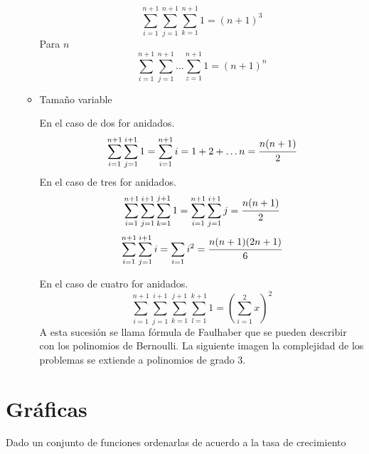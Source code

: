 \documentclass{article}
\begin{document}
\begin{enumerate}
\begin{itemize}
\begin{equation*}
    \sum_{i=1}^{n+1}\sum_{j=1}^{n+1}\sum_{k=1}^{n+1} 1 = (n+1)^3
\end{equation*}
Para $n$
\begin{equation*}
    \sum_{i=1}^{n+1}\sum_{j=1}^{n+1}\dots \sum_{z=1}^{n+1} 1 = (n+1)^n
\end{equation*}
\item Tamaño variable

En el caso de dos for anidados.
\begin{equation*}
    \sum_{i=1}^{n+1}\sum_{j=1}^{i+1} 1 = \sum_{i=1}^{n+1} i= 1 + 2 +\dots n = \cfrac{n(n+1)}{2}
\end{equation*}
En el caso de tres for anidados.
\begin{equation*}
    \sum_{i=1}^{n+1}\sum_{j=1}^{i+1}\sum_{k=1}^{j+1} 1 = \sum_{i=1}^{n+1}\sum_{j=1}^{i+1} j= \cfrac{n(n+1)}{2}
\end{equation*}
\begin{equation*}
     \sum_{i=1}^{n+1}\sum_{j=1}^{i+1} i= \sum_{i=1} i^2 = \cfrac{n(n+1)(2n+1)}{6}
\end{equation*}

En el caso de cuatro for anidados.
\begin{equation*}
    \sum_{i=1}^{n+1}\sum_{j=1}^{i+1}\sum_{k=1}^{j+1}\sum_{l=1}^{k+1} 1  = (\sum_{i=1}^2 x)^2
\end{equation*}
A esta sucesión se llama fórmula de Faulhaber que se pueden describir con los polinomios de Bernoulli. La siguiente imagen la complejidad de los problemas se extiende a polinomios de grado 3.
\end{itemize}
\end{enumerate}

\section{Gráficas}
Dado un conjunto de funciones ordenarlas de acuerdo a la tasa de crecimiento
\end{document}
